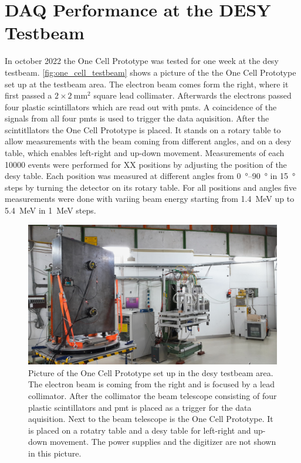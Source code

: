 \chapter{DAQ Performance at the DESY Testbeam}
In october 2022 the One Cell Prototype was tested for one week at the \ac{desy} testbeam.
\autoref{fig:one_cell_testbeam} shows a picture of the the One Cell Prototype set up at the testbeam area.
The electron beam comes form the right, where it first passed a $2\times\SI{2}{\milli\meter\squared}$ square lead collimater.
Afterwards the electrons passed four plastic scintillators which are read out with \acp{pmt}.
A coincidence of the signals from all four \acp{pmt} is used to trigger the data aquisition.
After the scintitllators the One Cell Prototype is placed.
It stands on a rotary table to allow measurements with the beam coming from different angles, and on a \ac{desy} table, which enables left-right and up-down movement.
Measurements of each \num{10000} events were performed for XX positions by adjusting the position of the \ac{desy} table.
Each position was measured at different angles from \SIrange{0}{90}{\degree} in \SI{15}{\degree} steps by turning the detector on its rotary table.
For all positions and angles five measurements were done with variing beam energy starting from \SI{1.4}{\mega\electronvolt} up to \SI{5.4}{\mega\electronvolt} in \SI{1}{\mega\electronvolt} steps.
\begin{figure}
	\centering
	\includegraphics[width=1.\textwidth]{pictures/one_cell_testbeam}
	\caption[One Cell Prototype at the \ac{desy} testbeam]{Picture of the One Cell Prototype set up in the \ac{desy} testbeam area. The electron beam is coming from the right and is focused by a lead collimator. After the collimator the beam telescope consisting of four plastic scintillators and \ac{pmt} is placed as a trigger for the data aquisition. Next to the beam telescope is the One Cell Prototype. It is placed on a rotatry table and a \ac{desy} table for left-right and up-down movement. The power supplies and the digitizer are not shown in this picture.}
	\label{fig:one_cell_testbeam}
\end{figure}

